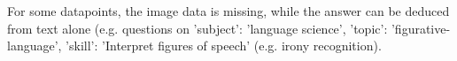 \documentclass{article}
\begin{document}

For some datapoints, the image data is missing, while the answer can be deduced from text alone (e.g. questions on 'subject': 'language science', 'topic': 'figurative-language', 'skill': 'Interpret figures of speech' (e.g. irony recognition). 
\end{document}

